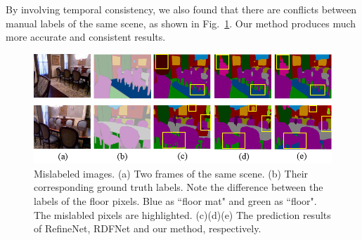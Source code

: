  By involving temporal consistency, we also found that there are conflicts between manual labels of the same scene, as shown in Fig.~\ref{fig:mislabels}. Our method produces much more accurate and consistent results.


\begin{figure}[!htbp]
	\setlength{\abovecaptionskip}{-0.2cm}
	\setlength{\belowcaptionskip}{-10cm}
	\centering
	\includegraphics[scale=0.4]{figure/Mislabels.png}
	\caption{Mislabeled images. (a) Two frames of the same scene. (b) Their corresponding ground truth labels. Note the difference between the labels of the floor pixels. Blue as ``floor mat" and green as ``floor".  The mislabled pixels are highlighted. (c)(d)(e) The prediction results of RefineNet, RDFNet and our method, respectively.}
	\label{fig:mislabels}
\end{figure}
%






